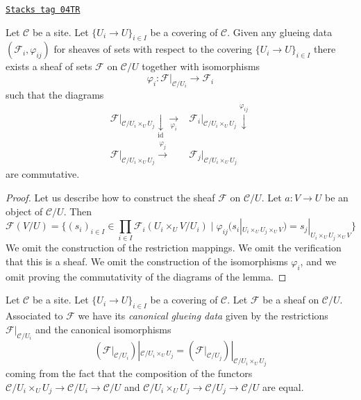 \begin{lemma}
\label{sites-lemma-glue-sheaves}
\href{https://stacks.math.columbia.edu/tag/04TR}{\texttt{Stacks tag 04TR}}

Let $\mathcal{C}$ be a site.
Let $\{U_i \to U\}_{i \in I}$ be a covering of $\mathcal{C}$.
Given any glueing data $(\mathcal{F}_i, \varphi_{ij})$
for sheaves of sets with respect to the covering $\{U_i \to U\}_{i \in I}$
there exists a sheaf of sets $\mathcal{F}$ on $\mathcal{C}/U$
together with isomorphisms
$$
\varphi_i : \mathcal{F}|_{\mathcal{C}/U_i} \to \mathcal{F}_i
$$
such that the diagrams
$$
\begin{array}{cc}\mathcal{F}|_{\mathcal{C}/U_i \times_U U_j}
\underset{\text{id}}{\downarrow}\underset{\varphi_i}{\longrightarrow} & \mathcal{F}_i|_{\mathcal{C}/U_i \times_U U_j} \overset{\varphi_{ij}}{\downarrow} \\ \mathcal{F}|_{\mathcal{C}/U_i \times_U U_j} \overset{\varphi_j}{\longrightarrow} & \mathcal{F}_j|_{\mathcal{C}/U_i \times_U U_j}\end{array}
$$
are commutative.
\end{lemma}

\begin{proof}
Let us describe how to construct the sheaf $\mathcal{F}$ on
$\mathcal{C}/U$. Let $a : V \to U$ be an object of $\mathcal{C}/U$.
Then
$$
\mathcal{F}(V/U) = \{
(s_i)_{i \in I} \in \prod_{i \in I} \mathcal{F}_i(U_i \times_U V/U_i)
\mid
\varphi_{ij}(s_i|_{U_i \times_U U_j \times_U V})
=
s_j|_{U_i \times_U U_j \times_U V}
\}
$$
We omit the construction of the restriction mappings.
We omit the verification that this is a sheaf.
We omit the construction of the isomorphisms $\varphi_i$,
and we omit proving the commutativity of the diagrams
of the lemma.
\end{proof}

Let $\mathcal{C}$ be a site.
Let $\{U_i \to U\}_{i \in I}$ be a covering of $\mathcal{C}$.
Let $\mathcal{F}$ be a sheaf on $\mathcal{C}/U$.
Associated to $\mathcal{F}$ we have its
{\it canonical glueing data} given by the restrictions
$\mathcal{F}|_{\mathcal{C}/U_i}$ and the canonical isomorphisms
$$
\left(\mathcal{F}|_{\mathcal{C}/U_i}\right)|_{\mathcal{C}/U_i \times_U U_j}
=
\left(\mathcal{F}|_{\mathcal{C}/U_j}\right)|_{\mathcal{C}/U_i \times_U U_j}
$$
coming from the fact that the composition of the functors
$\mathcal{C}/U_i \times_U U_j \to \mathcal{C}/U_i \to \mathcal{C}/U$
and
$\mathcal{C}/U_i \times_U U_j \to \mathcal{C}/U_j \to \mathcal{C}/U$
are equal.

